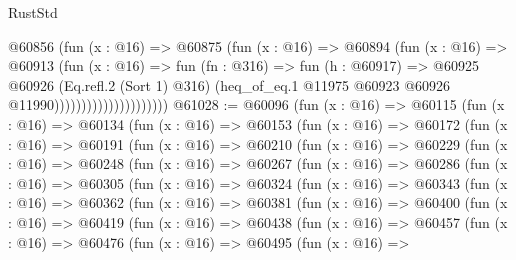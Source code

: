 \begin{lexlean}{RustStd}
\begin{coremodule}
                                  @60856
                                    (fun (x : @16) =>
                                    @60875
                                      (fun (x : @16) =>
                                      @60894
                                        (fun (x : @16) =>
                                        @60913
                                          (fun (x : @16) =>
                                          fun (fn : @316) =>
                                          fun (h : @60917) =>
                                          @60925
                                            @60926
                                            (Eq.refl.{2} (Sort 1) @316)
                                            (heq_of_eq.{1}
                                              @11975
                                              @60923
                                              @60926
                                              @11990)))))))))))))))))))))
@61028 := @60096
    (fun (x : @16) =>
    @60115
      (fun (x : @16) =>
      @60134
        (fun (x : @16) =>
        @60153
          (fun (x : @16) =>
          @60172
            (fun (x : @16) =>
            @60191
              (fun (x : @16) =>
              @60210
                (fun (x : @16) =>
                @60229
                  (fun (x : @16) =>
                  @60248
                    (fun (x : @16) =>
                    @60267
                      (fun (x : @16) =>
                      @60286
                        (fun (x : @16) =>
                        @60305
                          (fun (x : @16) =>
                          @60324
                            (fun (x : @16) =>
                            @60343
                              (fun (x : @16) =>
                              @60362
                                (fun (x : @16) =>
                                @60381
                                  (fun (x : @16) =>
                                  @60400
                                    (fun (x : @16) =>
                                    @60419
                                      (fun (x : @16) =>
                                      @60438
                                        (fun (x : @16) =>
                                        @60457
                                          (fun (x : @16) =>
                                          @60476
                                            (fun (x : @16) =>
                                            @60495
                                              (fun (x : @16) =>

\end{coremodule}
\end{lexlean}
